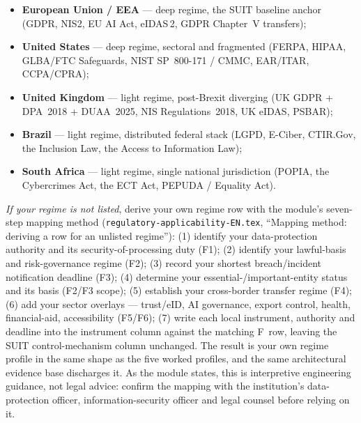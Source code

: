 \begin{itemize}[leftmargin=1.5em,nosep]
  \item \textbf{European Union / EEA} --- deep regime, the SUIT baseline anchor
        (GDPR, NIS2, EU AI Act, eIDAS\,2, GDPR Chapter~V transfers);
  \item \textbf{United States} --- deep regime, sectoral and fragmented (FERPA,
        HIPAA, GLBA/FTC Safeguards, NIST SP~800-171 / CMMC, EAR/ITAR,
        CCPA/CPRA);
  \item \textbf{United Kingdom} --- light regime, post-Brexit diverging (UK
        GDPR + DPA~2018 + DUAA~2025, NIS Regulations~2018, UK eIDAS, PSBAR);
  \item \textbf{Brazil} --- light regime, distributed federal stack (LGPD,
        E-Ciber, CTIR.Gov, the Inclusion Law, the Access to Information Law);
  \item \textbf{South Africa} --- light regime, single national jurisdiction
        (POPIA, the Cybercrimes Act, the ECT Act, PEPUDA / Equality Act).
\end{itemize}

\smallskip
\noindent\emph{If your regime is not listed}, derive your own regime row with
the module's seven-step mapping method
(\texttt{regulatory-applicability-EN.tex}, ``Mapping method: deriving a row for
an unlisted regime''): (1) identify your data-protection authority and its
security-of-processing duty (F1); (2) identify your lawful-basis and
risk-governance regime (F2); (3) record your shortest breach/incident
notification deadline (F3); (4) determine your essential-/important-entity
status and its basis (F2/F3 scope); (5) establish your cross-border transfer
regime (F4); (6) add your sector overlays --- trust/eID, AI governance, export
control, health, financial-aid, accessibility (F5/F6); (7) write each local
instrument, authority and deadline into the instrument column against the
matching F~row, leaving the SUIT control-mechanism column unchanged. The result
is your own regime profile in the same shape as the five worked profiles, and
the same architectural evidence base discharges it. As the module states, this
is interpretive engineering guidance, not legal advice: confirm the mapping
with the institution's data-protection officer, information-security officer
and legal counsel before relying on it.

\endinput
